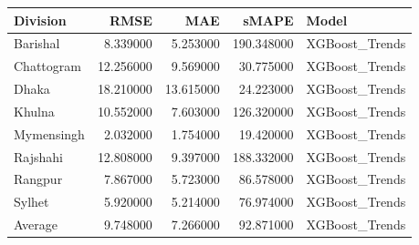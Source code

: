 \begin{tabular}{lrrrl}
\toprule
Division & RMSE & MAE & sMAPE & Model \\
\midrule
Barishal & 8.339000 & 5.253000 & 190.348000 & XGBoost_Trends \\
Chattogram & 12.256000 & 9.569000 & 30.775000 & XGBoost_Trends \\
Dhaka & 18.210000 & 13.615000 & 24.223000 & XGBoost_Trends \\
Khulna & 10.552000 & 7.603000 & 126.320000 & XGBoost_Trends \\
Mymensingh & 2.032000 & 1.754000 & 19.420000 & XGBoost_Trends \\
Rajshahi & 12.808000 & 9.397000 & 188.332000 & XGBoost_Trends \\
Rangpur & 7.867000 & 5.723000 & 86.578000 & XGBoost_Trends \\
Sylhet & 5.920000 & 5.214000 & 76.974000 & XGBoost_Trends \\
Average & 9.748000 & 7.266000 & 92.871000 & XGBoost_Trends \\
\bottomrule
\end{tabular}
